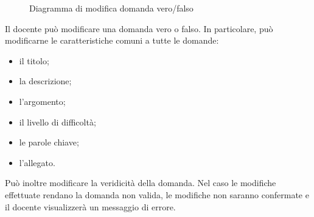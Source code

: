 \documentclass[a4paper, titlepage]{article}
\begin{document}
\newpage
{}
\begin{figure}[H]
	\centering
	\noindent{}
	\caption{Diagramma di modifica domanda vero/falso}
\end{figure}
Il docente può modificare una domanda vero o falso. In particolare, può modificarne le caratteristiche comuni a tutte le domande:
\begin{itemize}
	\item il titolo;
	\item la descrizione;
	\item l’argomento;
	\item il livello di difficoltà;
	\item le parole chiave;
	\item l’allegato.
\end{itemize}
Può inoltre modificare la veridicità della domanda.
Nel caso le modifiche effettuate rendano la domanda non valida, le modifiche non saranno confermate e il docente visualizzerà un messaggio di errore.
\end{document}
